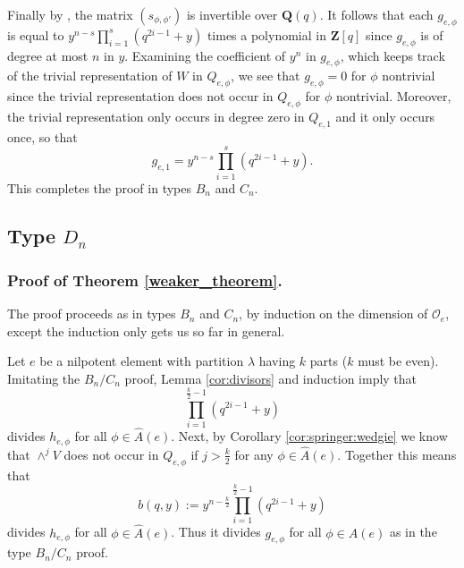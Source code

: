 \documentclass[10pt]{amsart}
\newcommand{\zz}{\mathbf Z}
\newcommand{\orbit}{\mathcal O}
\newcommand{\ar}{{\hat{A}}(e)}
\theoremstyle{plain}
\theoremstyle{definition}
\theoremstyle{remark}
\begin{document}
Finally by \cite[Lemma 4.11]{shoji:green_classical}, the matrix 
$(s_{\phi, \phi'})$ is invertible over $\mathbf{Q}(q)$.
It follows that each $g_{e, \phi}$ is equal to $y^{n-s} \prod_{i=1}^s (q^{2i-1}+ y)$ times a polynomial in $\zz[q]$
since $g_{e, \phi}$ is of degree at most $n$ in $y$.
Examining the coefficient of $y^n$ in $g_{e, \phi}$, which keeps track of the trivial representation of $W$ in $Q_{e,\phi}$,
we see that $g_{e, \phi} = 0$ for $\phi$ nontrivial since the trivial representation does not occur
in $Q_{e,\phi}$ for $\phi$ nontrivial.  Moreover, the trivial representation only occurs in degree zero in $Q_{e,1}$ and it only occurs once,
so that 
$$g_{e, 1} = y^{n-s} \prod_{i=1}^s (q^{2i-1}+ y).$$
This completes the proof in types $B_n$ and $C_n$.  

\subsection{\texorpdfstring{Type $D_n$}{Type Dn}}


\subsubsection{Proof of Theorem \ref{weaker_theorem}.}

The proof proceeds as in types $B_n$ and $C_n$, by induction on the dimension of $\orbit_e$, except the induction only gets us so far in general.   


Let $e$ be a nilpotent element with partition $\lambda$ having $k$ parts ($k$ must be even).
Imitating the $B_n/C_n$ proof, Lemma \ref{cor:divisors} and induction imply that
$$\prod_{i=1}^{\frac{k}{2} - 1} (q^{2i-1}+ y)$$ divides $h_{e, \phi}$ for all $\phi \in \ar$. 
Next, by Corollary \ref{cor:springer:wedgie} we know that 
$\wedge^{j} V$ does not occur in $Q_{e, \phi}$ if $j > \frac{k}{2}$ for any $\phi \in \ar$.
Together this means that
$$b(q,y) := y^{n - \frac{k}{2}}\prod_{i=1}^{\frac{k}{2} - 1} (q^{2i-1}+ y)$$ divides $h_{e, \phi}$ for all $\phi \in \ar$.
Thus it divides $g_{e, \phi}$ for all $\phi \in \ar$ as in the type $B_n/C_n$ proof.
\end{document}
